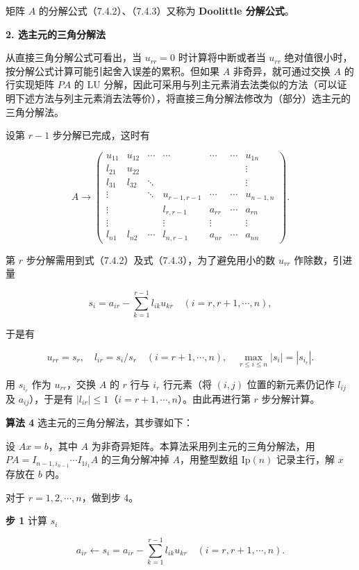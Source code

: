 \documentclass[
  10pt,
  fontset=fandol]{ctexart}
\begin{document}
矩阵 \(A\) 的分解公式（7.4.2）、（7.4.3）又称为 \textbf{Doolittle 分解公式}。

\textbf{2. 选主元的三角分解法}

从直接三角分解公式可看出，当 \(u_{rr}=0\) 时计算将中断或者当 \(u_{rr}\) 绝对值很小时，按分解公式计算可能引起舍入误差的累积。但如果 \(A\) 非奇异，就可通过交换 \(A\) 的行实现矩阵 \(PA\) 的 LU 分解，因此可采用与列主元素消去法类似的方法（可以证明下述方法与列主元素消去法等价），将直接三角分解法修改为（部分）选主元的三角分解法。

设第 \(r-1\) 步分解已完成，这时有

\[
A\to\begin{pmatrix}
u_{11}&u_{12}&\cdots&\cdots&\cdots&\cdots&u_{1n}\\
l_{21}&u_{22}&&&&&\vdots\\
l_{31}&l_{32}&\ddots&&&&\vdots\\
\vdots&&\ddots&u_{r-1,r-1}&\cdots&\cdots&u_{n-1,n}\\
\vdots&&&l_{r,r-1}&a_{rr}&\cdots&a_{rn}\\
\vdots&&&\vdots&\vdots&&\vdots\\
l_{n1}&l_{n2}&\cdots&l_{n,r-1}&a_{nr}&\cdots&a_{nn}
\end{pmatrix}.
\]

第 \(r\) 步分解需用到式（7.4.2）及式（7.4.3），为了避免用小的数 \(u_{rr}\) 作除数，引进量

\[s_i=a_{ir}-\sum_{k=1}^{r-1}l_{ik}u_{kr}\quad(i=r,r+1,\cdots,n),\]

于是有

\[u_{rr}=s_r,\quad l_{ir}=s_i/s_r\quad(i=r+1,\cdots,n),\quad \max_{r\le i\le n}|s_i|=|s_{i_r}|.\]

用 \(s_{i_r}\) 作为 \(u_{rr}\)，交换 \(A\) 的 \(r\) 行与 \(i_r\) 行元素（将 \((i,j)\) 位置的新元素仍记作 \(l_{ij}\) 及 \(a_{ij}\)），于是有 \(|l_{ir}|\le1\)（\(i=r+1,\cdots,n\)）。由此再进行第 \(r\) 步分解计算。

\textbf{算法 4} 选主元的三角分解法，其步骤如下：

设 \(Ax=b\)，其中 \(A\) 为非奇异矩阵。本算法采用列主元的三角分解法，用 \(PA=I_{n-1,i_{n-1}}\cdots I_{1i_1}A\) 的三角分解冲掉 \(A\)，用整型数组 \(\mathrm{Ip}(n)\) 记录主行，解 \(x\) 存放在 \(b\) 内。

对于 \(r=1,2,\cdots,n\)，做到步 4。

\textbf{步 1} 计算 \(s_i\)

\[a_{ir}\leftarrow s_i=a_{ir}-\sum_{k=1}^{r-1}l_{ik}u_{kr}\quad(i=r,r+1,\cdots,n).\]
\end{document}
